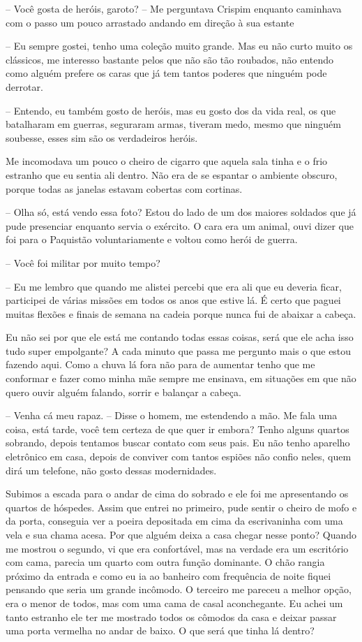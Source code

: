 -- Você gosta de heróis, garoto? -- Me perguntava Crispim enquanto caminhava com o passo um pouco arrastado andando em direção à sua estante

-- Eu sempre gostei, tenho uma coleção muito grande. Mas eu não curto muito os clássicos, me interesso bastante pelos que não são tão roubados, não entendo como alguém prefere os caras que já tem tantos poderes que ninguém pode derrotar.

-- Entendo, eu também gosto de heróis, mas eu gosto dos da vida real, os que batalharam em guerras, seguraram armas, tiveram medo, mesmo que ninguém soubesse, esses sim são os verdadeiros heróis.

Me incomodava um pouco o cheiro de cigarro que aquela sala tinha e o frio estranho que eu sentia ali dentro. Não era de se espantar o ambiente obscuro, porque todas as janelas estavam cobertas com cortinas.

-- Olha só, está vendo essa foto? Estou do lado de um dos maiores soldados que já pude presenciar enquanto servia o exército. O cara era um animal, ouvi dizer que foi para o Paquistão voluntariamente e voltou como herói de guerra.

-- Você foi militar por muito tempo?

-- Eu me lembro que quando me alistei percebi que era ali que eu deveria ficar, participei de várias missões em todos os anos que estive lá. É certo que paguei muitas flexões e finais de semana na cadeia porque nunca fui de abaixar a cabeça.

Eu não sei por que ele está me contando todas essas coisas, será que ele acha isso tudo super empolgante? A cada minuto que passa me pergunto mais o que estou fazendo aqui. Como a chuva lá fora não para de aumentar tenho que me conformar e fazer como minha mãe sempre me ensinava, em situações em que não quero ouvir alguém falando, sorrir e balançar a cabeça.

-- Venha cá meu rapaz. -- Disse o homem, me estendendo a mão. Me fala uma coisa, está tarde, você tem certeza de que quer ir embora? Tenho alguns quartos sobrando, depois tentamos buscar contato com seus pais. Eu não tenho aparelho eletrônico em casa, depois de conviver com tantos espiões não confio neles, quem dirá um telefone, não gosto dessas modernidades.

Subimos a escada para o andar de cima do sobrado e ele foi me apresentando os quartos de hóspedes. Assim que entrei no primeiro, pude sentir o cheiro de mofo e da porta, conseguia ver a poeira depositada em cima da escrivaninha com uma vela e sua chama acesa. Por que alguém deixa a casa chegar nesse ponto? Quando me mostrou o segundo, vi que era confortável, mas na verdade era um escritório com cama, parecia um quarto com outra função dominante. O chão rangia próximo da entrada e como eu ia ao banheiro com frequência de noite fiquei pensando que seria um grande incômodo. O terceiro me pareceu a melhor opção, era o menor de todos, mas com uma cama de casal aconchegante. Eu achei um tanto estranho ele ter me mostrado todos os cômodos da casa e deixar passar uma porta vermelha no andar de baixo. O que será que tinha lá dentro?

